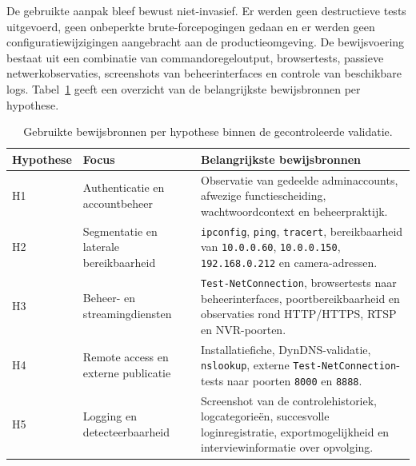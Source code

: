 De gebruikte aanpak bleef bewust niet-invasief. Er werden geen destructieve tests uitgevoerd, geen onbeperkte brute-forcepogingen gedaan en er werden geen configuratiewijzigingen aangebracht aan de productieomgeving. De bewijsvoering bestaat uit een combinatie van commandoregeloutput, browsertests, passieve netwerkobservaties, screenshots van beheerinterfaces en controle van beschikbare logs. Tabel~\ref{tab:validatie-bewijsbronnen} geeft een overzicht van de belangrijkste bewijsbronnen per hypothese.

\begin{table}[htbp]
    \centering
    \small
    \caption[Bewijsbronnen per hypothese]{Gebruikte bewijsbronnen per hypothese binnen de gecontroleerde validatie.}
    \label{tab:validatie-bewijsbronnen}
    \begin{tabular}{p{}p{}p{}}
        \hline
        \textbf{Hypothese} & \textbf{Focus} & \textbf{Belangrijkste bewijsbronnen} \\
        \hline
        H1 & Authenticatie en accountbeheer & Observatie van gedeelde adminaccounts, afwezige functiescheiding, wachtwoordcontext en beheerpraktijk. \\
        H2 & Segmentatie en laterale bereikbaarheid & \texttt{ipconfig}, \texttt{ping}, \texttt{tracert}, bereikbaarheid van \texttt{10.0.0.60}, \texttt{10.0.0.150}, \texttt{192.168.0.212} en camera-adressen. \\
        H3 & Beheer- en streamingdiensten & \texttt{Test-NetConnection}, browsertests naar beheerinterfaces, poortbereikbaarheid en observaties rond HTTP/HTTPS, RTSP en NVR-poorten. \\
        H4 & Remote access en externe publicatie & Installatiefiche, DynDNS-validatie, \texttt{nslookup}, externe \texttt{Test-NetConnection}-tests naar poorten \texttt{8000} en \texttt{8888}. \\
        H5 & Logging en detecteerbaarheid & Screenshot van de controlehistoriek, logcategorieën, succesvolle loginregistratie, exportmogelijkheid en interviewinformatie over opvolging. \\
        \hline
    \end{tabular}
\end{table}

\section{}%
\label{sec:h1-authenticatie}


